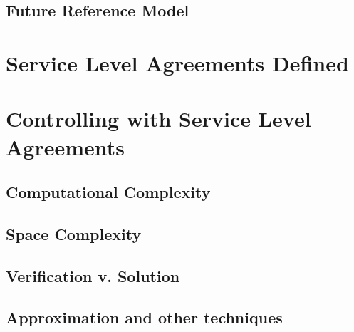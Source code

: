 \subsection{Future Reference Model}

\section{Service Level Agreements Defined}

\section{Controlling with Service Level Agreements}

\subsection{Computational Complexity}

\subsection{Space Complexity}

\subsection{Verification v. Solution}

\subsection{Approximation and other techniques}





